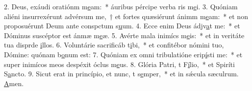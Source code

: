 2. Deus, exáudi oratiónm m\uline{e}am:~* áuribus pércipe verba ris m\uline{e}i.
3. Quóniam aliéni insurrexérunt advérsum me,~† et fortes quæsiérunt ánimm m\uline{e}am:~* et non proposuérunt Deum ante conspctum s\uline{u}um.
4. Ecce enim Deus ádjv\uline{a}t me:~* et Dóminus suscéptor est ánmæ m\uline{e}æ.
5. Avérte mala inimícs m\uline{e}is:~* et in veritáte tua disprde \uline{i}llos.
6. Voluntárie sacrificáb t\uline{i}bi,~* et confitébor nómini tuo, Dómine: quónam b\uline{o}num est:
7. Quóniam ex omni tribulatióne erip\uline{í}sti me:~* et super inimícos meos despéxit óclus m\uline{e}us.
8. Glória Patri, t F\uline{í}lio,~* et Spiríti S\uline{a}ncto.
9. Sicut erat in princípio, et nunc, t s\uline{e}mper,~* et in sǽcula sæculrum. \uline{A}men.
